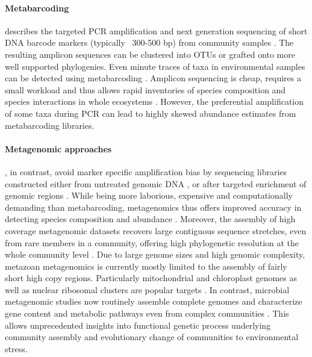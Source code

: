 \documentclass[12pt]{article}
\begin{document}
\paragraph{Metabarcoding} describes the targeted PCR amplification and
next generation sequencing of short DNA barcode markers (typically
~300-500 bp) from community samples \citep{Yu2012, ji2013}. The
resulting amplicon sequences can be clustered into OTUs or grafted
onto more well supported phylogenies. Even minute traces of taxa in
environmental samples can be detected using metabarcoding
\citep{bohmann2014}.  Amplicon sequencing is cheap, requires a small
workload and thus allows rapid inventories of species composition and
species interactions in whole ecosystems \citep{gibson2014, leray2015,
  pompanon2012}. However, the preferential amplification of some taxa
during PCR can lead to highly skewed abundance estimates
\citep{Yu2012, elbrecht2015} from metabarcoding libraries.

\paragraph{Metagenomic approaches}, in contrast, avoid marker specific
amplification bias by sequencing libraries constructed either from
untreated genomic DNA \citep{dodsworth2015, linard2015, tang2014}, or
after targeted enrichment of genomic regions \citep{liu2016}. While
being more laborious, expensive and computationally demanding than
metabarcoding, metagenomics thus offers improved accuracy in detecting
species composition and abundance \citep{zhou2013}. Moreover, the
assembly of high coverage metagenomic datasets recovers large
contiguous sequence stretches, even from rare members in a community,
offering high phylogenetic resolution at the whole community level
\citep{coissac2016}. Due to large genome sizes and high genomic
complexity, metazoan metagenomics is currently mostly limited to the
assembly of fairly short high copy regions. Particularly mitochondrial
and chloroplast genomes as well as nuclear ribosomal clusters are
popular targets \citep{dodsworth2015, coissac2016}. In contrast,
microbial metagenomic studies now routinely assemble complete genomes
and characterize gene content and metabolic pathways even from complex
communities \citep{nielsen2014}. This allows unprecedented insights
into functional genetic process underlying community assembly and
evolutionary change of communities to environmental stress.

\end{document}
